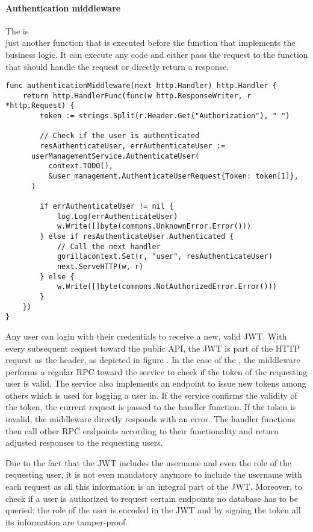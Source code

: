 \documentclass[12pt,a4paper,twoside]{report}
\begin{document}
\paragraph{Authentication middleware}
The  is\\
just another function that is executed before the function
that implements the business logic.
It can execute any code and either pass the request to the function that should
handle the request or directly return a response.

\begin{lstlisting}[title=api-gateway/middlewares.go, float, floatplacement=H]
func authenticationMiddleware(next http.Handler) http.Handler {
	return http.HandlerFunc(func(w http.ResponseWriter, r *http.Request) {
		token := strings.Split(r.Header.Get("Authorization"), " ")

		// Check if the user is authenticated
		resAuthenticateUser, errAuthenticateUser :=
      userManagementService.AuthenticateUser(
          context.TODO(),
          &user_management.AuthenticateUserRequest{Token: token[1]},
      )

		if errAuthenticateUser != nil {
			log.Log(errAuthenticateUser)
			w.Write([]byte(commons.UnknownError.Error()))
		} else if resAuthenticateUser.Authenticated {
			// Call the next handler
			gorillacontext.Set(r, "user", resAuthenticateUser)
			next.ServeHTTP(w, r)
		} else {
			w.Write([]byte(commons.NotAuthorizedError.Error()))
		}
	})
}
\end{lstlisting}

Any user can login with their credentials to receive a new, valid JWT.
With every subsequent request toward the public API, the JWT is part of the
HTTP request as the  header, as depicted
in figure .
In the case of the , the middleware performs
a regular RPC toward the  service to check if the
token of the requesting user is valid. The  service also
implements an endpoint to issue new tokens among others which is used for logging
a user in.
If the service confirms the validity of the token, the current request is passed
to the handler function. If the token is invalid, the middleware directly responds
with an error.
The handler functions then call other RPC endpoints according to their functionality
and return adjusted responses to the requesting users.

Due to the fact that the JWT includes the username and even the role of the
requesting user, it is not even mandatory anymore to include the username with
each request as all this information is an integral part of the JWT.
Moreover, to check if a user is authorized to request certain endpoints no
database has to be queried; the role of the user is encoded in the JWT and
by signing the token all its information are tamper-proof.
\end{document}
